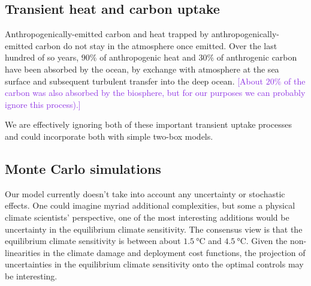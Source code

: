\documentclass{article}
\begin{document}
\subsection{Transient heat and carbon uptake}
Anthropogenically-emitted carbon and heat trapped by anthropogenically-emitted carbon do not stay in the atmosphere once emitted. Over the last hundred of so years, $90\%$ of anthropogenic heat and $30\%$ of anthrogenic carbon have been absorbed by the ocean, by exchange with atmosphere at the sea surface and subsequent turbulent transfer into the deep ocean. \textcolor{BlueViolet}{[About $20\%$ of the carbon was also absorbed by the biosphere, but for our purposes we can probably ignore this process).]}

We are effectively ignoring both of these important transient uptake processes and could incorporate both with simple two-box models.

\subsection{Monte Carlo simulations}

Our model currently doesn't take into account any uncertainty or stochastic effects. One could imagine myriad additional complexities, but some a physical climate scientists' perspective, one of the most interesting additions would be uncertainty in the equilibrium climate sensitivity. The consensus view is that the equilibrium climate sensitivity is between about $\SI{1.5}{\celsius}$ and $\SI{4.5}{\celsius}$. Given the non-linearities in the climate damage and deployment cost functions, the projection of uncertainties in the equilibrium climate sensitivity onto the optimal controls may be interesting.

%
%
\end{document}

